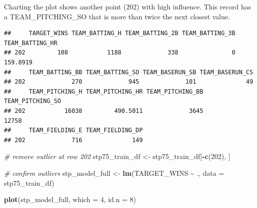 \documentclass[
]{article}
\newenvironment{Shaded}{\begin{snugshade}}{\end{snugshade}}
\newcommand{\AttributeTok}[1]{\textcolor[rgb]{0.13,0.29,0.53}{#1}}
\newcommand{\CommentTok}[1]{\textcolor[rgb]{0.56,0.35,0.01}{\textit{#1}}}
\newcommand{\DecValTok}[1]{\textcolor[rgb]{0.00,0.00,0.81}{#1}}
\newcommand{\FunctionTok}[1]{\textcolor[rgb]{0.13,0.29,0.53}{\textbf{#1}}}
\newcommand{\NormalTok}[1]{#1}
\newcommand{\OtherTok}[1]{\textcolor[rgb]{0.56,0.35,0.01}{#1}}
\newcommand{\SpecialCharTok}[1]{\textcolor[rgb]{0.81,0.36,0.00}{\textbf{#1}}}
\newcommand{\StringTok}[1]{\textcolor[rgb]{0.31,0.60,0.02}{#1}}
\begin{document}
Charting the plot shows another point (202) with high influence. This
record has a TEAM\_PITCHING\_SO that is more than twice the next closest
value.

\begin{Shaded}
\end{Shaded}

\begin{verbatim}
##     TARGET_WINS TEAM_BATTING_H TEAM_BATTING_2B TEAM_BATTING_3B TEAM_BATTING_HR
## 202         108           1188             338               0        159.8919
##     TEAM_BATTING_BB TEAM_BATTING_SO TEAM_BASERUN_SB TEAM_BASERUN_CS
## 202             270             945             101              49
##     TEAM_PITCHING_H TEAM_PITCHING_HR TEAM_PITCHING_BB TEAM_PITCHING_SO
## 202           16038         490.5011             3645            12758
##     TEAM_FIELDING_E TEAM_FIELDING_DP
## 202             716              149
\end{verbatim}

\begin{Shaded}
\begin{Highlighting}[]
\CommentTok{\# remove outlier at row 202}
\NormalTok{stp75\_train\_df }\OtherTok{\textless{}{-}}\NormalTok{ stp75\_train\_df[}\SpecialCharTok{{-}}\FunctionTok{c}\NormalTok{(}\DecValTok{202}\NormalTok{), ]}

\CommentTok{\# confirm outliers}
\NormalTok{stp\_model\_full }\OtherTok{\textless{}{-}} \FunctionTok{lm}\NormalTok{(TARGET\_WINS }\SpecialCharTok{\textasciitilde{}}\NormalTok{ ., }\AttributeTok{data =}\NormalTok{ stp75\_train\_df)}

\FunctionTok{plot}\NormalTok{(stp\_model\_full, }\AttributeTok{which =} \DecValTok{4}\NormalTok{,  }\AttributeTok{id.n =} \DecValTok{8}\NormalTok{)}
\end{Highlighting}
\end{Shaded}
\end{document}
